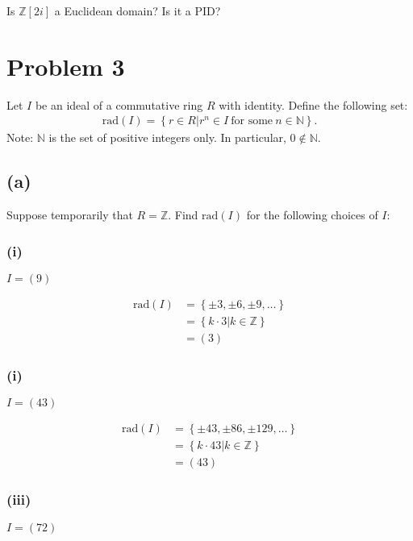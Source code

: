 \documentclass[10pt]{armath}
\newcommand{\Z}{\mathbb{Z}}
\newcommand{\N}{\mathbb{N}}
\newcommand{\zi}{\mathbb{Z}\left[2i\right]}
\newcommand{\rad}[1]{\text{rad}\left(#1\right)}
\begin{document}
Is $\zi$ a Euclidean domain? Is it a PID\@?

\section*{Problem 3}%
\label{sec:problem_3}

Let $I$ be an ideal of a commutative ring $R$ with identity. Define the
following set:
\begin{align*}
  \rad{I}=\left\{r\in R|r^n\in I\ \text{for some}\ n\in\N\right\}.
\end{align*}
Note: $\N$ is the set of positive integers only. In particular, $0 \notin \N$.

\subsection*{(a)}%
\label{sub:_a3_}

Suppose temporarily that $R=\Z$. Find $\rad{I}$ for the following choices of
$I$:

\subsubsection*{(i)}%
\label{ssub:_i_}

$I=(9)$

\begin{align*}
  \rad{I}&=\left\{\pm 3, \pm6, \pm 9, \ldots\right\}\\
  &=\left\{k\cdot 3|k\in\Z\right\}\\
  &=(3)
\end{align*}

\subsubsection*{(i)}%
\label{ssub:_i_}

$I=(43)$

\begin{align*}
  \rad{I}&=\left\{\pm43, \pm86, \pm129, \ldots\right\}\\
  &=\left\{k\cdot 43|k\in\Z\right\}\\
  &=(43)
\end{align*}

\subsubsection*{(iii)}%
\label{ssub:_i_}

$I=(72)$
\end{document}
